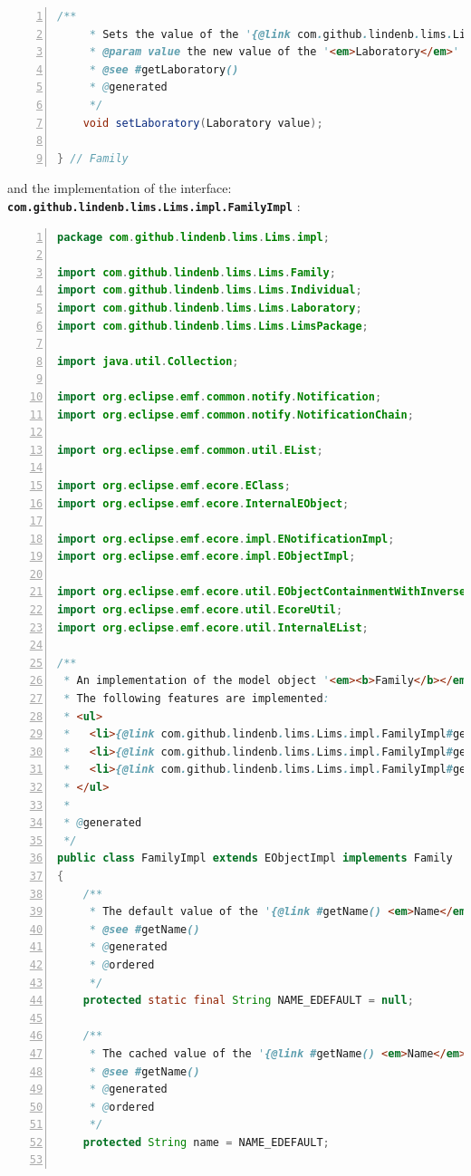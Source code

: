 \documentclass{article}
\begin{document}
\begin{lstlisting}[language=java,basicstyle=\tiny,breaklines=true,numbers=left]
	/**
	 * Sets the value of the '{@link com.github.lindenb.lims.Lims.Family#getLaboratory <em>Laboratory</em>}' container reference.
	 * @param value the new value of the '<em>Laboratory</em>' container reference.
	 * @see #getLaboratory()
	 * @generated
	 */
	void setLaboratory(Laboratory value);

} // Family
\end{lstlisting}
and the implementation of the interface: \textbf{\texttt{com.github.lindenb.lims.Lims.impl.FamilyImpl}} :
\begin{lstlisting}[language=java,basicstyle=\tiny,breaklines=true,numbers=left]
package com.github.lindenb.lims.Lims.impl;

import com.github.lindenb.lims.Lims.Family;
import com.github.lindenb.lims.Lims.Individual;
import com.github.lindenb.lims.Lims.Laboratory;
import com.github.lindenb.lims.Lims.LimsPackage;

import java.util.Collection;

import org.eclipse.emf.common.notify.Notification;
import org.eclipse.emf.common.notify.NotificationChain;

import org.eclipse.emf.common.util.EList;

import org.eclipse.emf.ecore.EClass;
import org.eclipse.emf.ecore.InternalEObject;

import org.eclipse.emf.ecore.impl.ENotificationImpl;
import org.eclipse.emf.ecore.impl.EObjectImpl;

import org.eclipse.emf.ecore.util.EObjectContainmentWithInverseEList;
import org.eclipse.emf.ecore.util.EcoreUtil;
import org.eclipse.emf.ecore.util.InternalEList;

/**
 * An implementation of the model object '<em><b>Family</b></em>'.
 * The following features are implemented:
 * <ul>
 *   <li>{@link com.github.lindenb.lims.Lims.impl.FamilyImpl#getName <em>Name</em>}</li>
 *   <li>{@link com.github.lindenb.lims.Lims.impl.FamilyImpl#getIndividuals <em>Individuals</em>}</li>
 *   <li>{@link com.github.lindenb.lims.Lims.impl.FamilyImpl#getLaboratory <em>Laboratory</em>}</li>
 * </ul>
 *
 * @generated
 */
public class FamilyImpl extends EObjectImpl implements Family
{
	/**
	 * The default value of the '{@link #getName() <em>Name</em>}' attribute.
	 * @see #getName()
	 * @generated
	 * @ordered
	 */
	protected static final String NAME_EDEFAULT = null;

	/**
	 * The cached value of the '{@link #getName() <em>Name</em>}' attribute.
	 * @see #getName()
	 * @generated
	 * @ordered
	 */
	protected String name = NAME_EDEFAULT;


\end{lstlisting}
\end{document}
